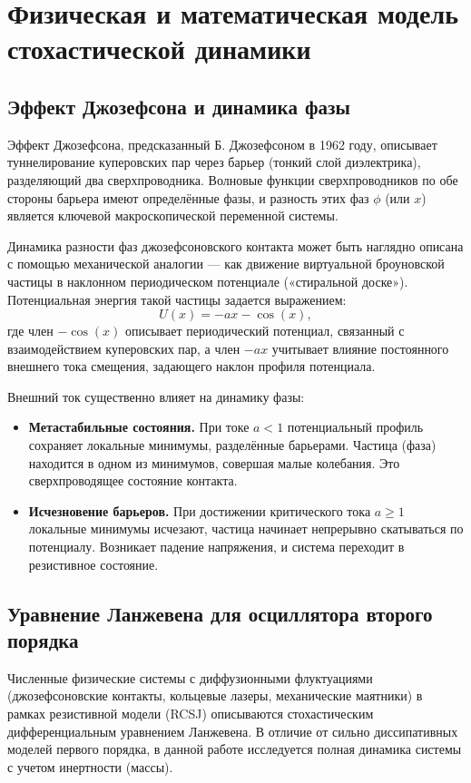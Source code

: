 \newpage

\section{Физическая и математическая модель стохастической динамики}

\subsection{Эффект Джозефсона и динамика фазы}
Эффект Джозефсона, предсказанный Б. Джозефсоном в 1962 году, описывает туннелирование куперовских пар через барьер (тонкий слой диэлектрика), разделяющий два сверхпроводника. Волновые функции сверхпроводников по обе стороны барьера имеют определённые фазы, и разность этих фаз $\phi$ (или $x$) является ключевой макроскопической переменной системы. 

Динамика разности фаз джозефсоновского контакта может быть наглядно описана с помощью механической аналогии — как движение виртуальной броуновской частицы в наклонном периодическом потенциале («стиральной доске»). Потенциальная энергия такой частицы задается выражением:
\begin{equation}
    U(x) = -a x - \cos(x),
    \label{eq:potential}
\end{equation}
где член $-\cos(x)$ описывает периодический потенциал, связанный с взаимодействием куперовских пар, а член $-ax$ учитывает влияние постоянного внешнего тока смещения, задающего наклон профиля потенциала.

Внешний ток существенно влияет на динамику фазы:
\begin{itemize}
    \item \textbf{Метастабильные состояния.} При токе $a < 1$ потенциальный профиль сохраняет локальные минимумы, разделённые барьерами. Частица (фаза) находится в одном из минимумов, совершая малые колебания. Это сверхпроводящее состояние контакта.
    \item \textbf{Исчезновение барьеров.} При достижении критического тока $a \ge 1$ локальные минимумы исчезают, частица начинает непрерывно скатываться по потенциалу. Возникает падение напряжения, и система переходит в резистивное состояние.
\end{itemize}

\subsection{Уравнение Ланжевена для осциллятора второго порядка}
Численные физические системы с диффузионными флуктуациями (джозефсоновские контакты, кольцевые лазеры, механические маятники) в рамках резистивной модели (RCSJ) описываются стохастическим дифференциальным уравнением Ланжевена. В отличие от сильно диссипативных моделей первого порядка, в данной работе исследуется полная динамика системы с учетом инертности (массы). 

